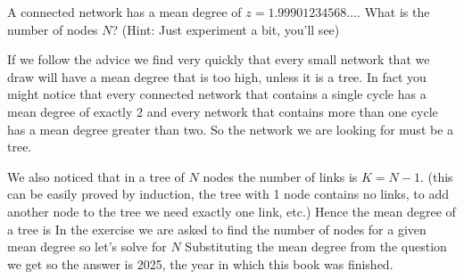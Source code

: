 
A connected network has a mean degree of 
$z=1.99901234568\ldots$. What is the number of nodes $N$? (Hint: Just experiment a bit, you'll see)

\solution
If we follow the advice we find very quickly that every small network that we draw will have a mean degree that is too high, unless it is a tree. In fact you might notice that every connected network that contains a single cycle has a mean degree of exactly 2 and every network that contains more than one cycle has a mean degree greater than two. So the network we are looking for must be a tree. 

We also noticed that in a tree of $N$ nodes the number of links is $K=N-1$. 
(this can be easily proved by induction, the tree with 1 node contains no links, to add another node to the tree we need exactly one link, etc.)
Hence the mean degree of a tree is 
In the exercise we are asked to find the number of nodes for a given mean degree so let's solve for $N$
Substituting the mean degree from the question we get
so the answer is 2025, the year in which this book was finished.  
